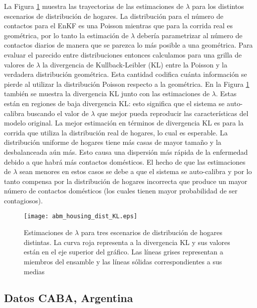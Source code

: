 La Figura \ref{fig:abm_housing_dist_KL} muestra las trayectorias de las estimaciones de $\lambda$ para los distintos escenarios de distribución de hogares. La distribución para el número de contactos para el EnKF es una Poisson mientras que para la corrida real es geométrica, por lo tanto la estimación de $\lambda$ debería parametrizar al número de contactos diarios de manera que se parezca lo más posible a una geométrica. Para evaluar el parecido entre distribuciones entonces calculamos para una grilla de valores de $\lambda$ la divergencia de Kullback-Leibler (KL) entre la Poisson y la verdadera distribución geométrica. Esta cantidad codifica cuánta información se pierde al utilizar la distribución Poisson respecto a la geométrica. En la Figura \ref{fig:abm_housing_dist_KL} también se muestra la divergencia KL junto con las estimaciones de $\lambda$. Estas están en regiones de baja divergencia KL: esto significa que el sistema se auto-calibra buscando el valor de $\lambda$ que mejor pueda reproducir las características del modelo original. La mejor estimación en términos de divergencia KL es para la corrida que utiliza la distribución real de hogares, lo cual es esperable. La distribución uniforme de hogares tiene más casas de mayor tamaño y la desbalanceada aún más. Esto causa una dispersión más rápida de la enfermedad debido a que habrá más contactos domésticos. El hecho de que las estimaciones de $\lambda$ sean menores en estos casos se debe a que el sistema se auto-calibra y por lo tanto compensa por la distribución de hogares incorrecta que produce un mayor número de contactos domésticos (los cuales tienen mayor probabilidad de ser contagiosos).
\begin{figure}[h]
    \centering
    \texttt{[image: abm\_housing\_dist\_KL.eps]}
    \caption{Estimaciones de $\lambda$ para tres escenarios de distribución de hogares distintas. La curva roja representa a la divergencia KL y sus valores están en el eje superior del gráfico. Las líneas grises representan a miembros del ensamble y las líneas sólidas correspondientes a sus medias}
    \label{fig:abm_housing_dist_KL}
\end{figure}

\subsection{Datos CABA, Argentina}

